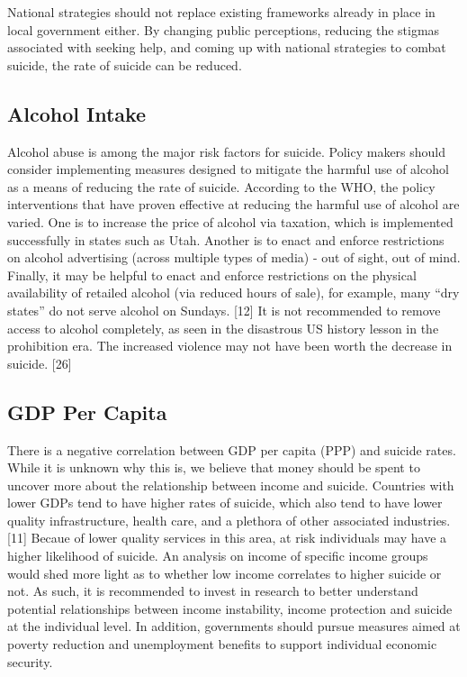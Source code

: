 \documentclass[]{article}
\begin{document}
National strategies should not replace existing frameworks already in
place in local government either. By changing public perceptions,
reducing the stigmas associated with seeking help, and coming up with
national strategies to combat suicide, the rate of suicide can be
reduced.

\subsection{Alcohol Intake}\label{alcohol-intake}

Alcohol abuse is among the major risk factors for suicide. Policy makers
should consider implementing measures designed to mitigate the harmful
use of alcohol as a means of reducing the rate of suicide. According to
the WHO, the policy interventions that have proven effective at reducing
the harmful use of alcohol are varied. One is to increase the price of
alcohol via taxation, which is implemented successfully in states such
as Utah. Another is to enact and enforce restrictions on alcohol
advertising (across multiple types of media) - out of sight, out of
mind. Finally, it may be helpful to enact and enforce restrictions on
the physical availability of retailed alcohol (via reduced hours of
sale), for example, many ``dry states'' do not serve alcohol on Sundays.
{[}12{]} It is not recommended to remove access to alcohol completely,
as seen in the disastrous US history lesson in the prohibition era. The
increased violence may not have been worth the decrease in suicide.
{[}26{]}

\subsection{GDP Per Capita}\label{gdp-per-capita}

There is a negative correlation between GDP per capita (PPP) and suicide
rates. While it is unknown why this is, we believe that money should be
spent to uncover more about the relationship between income and suicide.
Countries with lower GDPs tend to have higher rates of suicide, which
also tend to have lower quality infrastructure, health care, and a
plethora of other associated industries. {[}11{]} Becaue of lower
quality services in this area, at risk individuals may have a higher
likelihood of suicide. An analysis on income of specific income groups
would shed more light as to whether low income correlates to higher
suicide or not. As such, it is recommended to invest in research to
better understand potential relationships between income instability,
income protection and suicide at the individual level. In addition,
governments should pursue measures aimed at poverty reduction and
unemployment benefits to support individual economic security.
\end{document}
